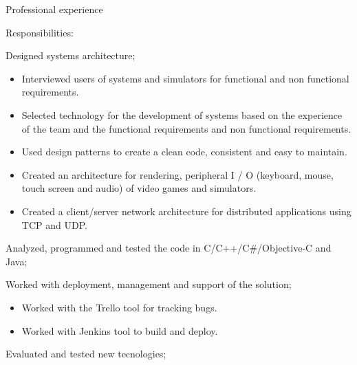 \documentclass{resume}
\begin{document}
\begin{rSection}{Professional experience}
      \begin{rSubsection}{\fontsize{9}{10}\selectfont Responsibilities:}{}{}{}
        \item Designed systems architecture;
          \begin{addmargin}[1em]{2em}
            \renewcommand\labelitemi{$\cdot$}
            \begin{itemize}
              \item Interviewed users of systems and simulators for functional and non functional requirements.
              \item Selected technology for the development of systems based on the experience of the team and the functional requirements and non functional requirements.
              \item Used design patterns to create a clean code, consistent and easy to maintain.
              \item Created an architecture for rendering, peripheral I / O (keyboard, mouse, touch screen and audio) of video games and simulators.
              \item Created a client/server network architecture for distributed applications using TCP and UDP.\\
            \end{itemize}
          \end{addmargin}
        \item Analyzed, programmed and tested the code in C/C++/C\#/Objective-C and Java;
        \item Worked with deployment, management and support of the solution;
            \begin{addmargin}[1em]{2em}
              \renewcommand\labelitemi{$\cdot$}
                \begin{itemize}
                  \item Worked with the Trello tool for tracking bugs.
                  \item Worked with Jenkins tool to build and deploy.
                \end{itemize}
            \end{addmargin}
        \item Evaluated and tested new tecnologies;
      \end{rSubsection}


\end{rSection}
\end{document}
